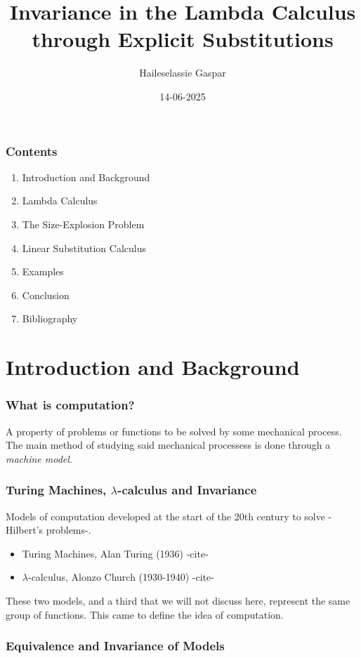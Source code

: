 \documentclass{beamer}
\title{Invariance in the Lambda Calculus through Explicit Substitutions}
\author{Haileselassie Gaspar}
\institute{Vrije Universiteit Amsterdam}
\date{14-06-2025}
\begin{document}
\frame{\titlepage}

\begin{frame}
  \frametitle{Contents}
  \begin{enumerate}
    \item Introduction and Background
    \item Lambda Calculus
    \item The Size-Explosion Problem
    \item Linear Substitution Calculus
    \item Examples
    \item Conclusion
    \item Bibliography
  \end{enumerate}
\end{frame}
\section{Introduction and Background}
\begin{frame}
  \frametitle{What is computation?}
  A property of problems or functions to be solved by some mechanical process. The main method of studying said mechanical processess is done through a \textit{machine model}.
\end{frame}
\begin{frame}
  \frametitle{Turing Machines, $\lambda$-calculus and Invariance}
Models of computation developed at the start of the 20th century to solve -Hilbert's problems-.
  \begin{itemize}
    \item Turing Machines, Alan Turing (1936) -cite-
          \item $\lambda$-calculus, Alonzo Church (1930-1940) -cite-
  \end{itemize}
  These two models, and a third that we will not discuss here, represent the same group of functions. This came to define the idea of computation.
\end{frame}
\begin{frame}
  \frametitle{Equivalence and Invariance of Models}

\end{frame}
\end{document}
